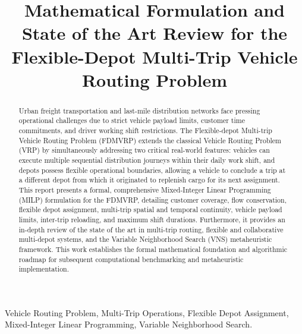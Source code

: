\documentclass[conference]{IEEEtran}
\begin{document}
\title{Mathematical Formulation and State of the Art Review for the Flexible-Depot Multi-Trip Vehicle Routing Problem}

\author{
}

\maketitle

\begin{abstract}
Urban freight transportation and last-mile distribution networks face pressing operational challenges due to strict vehicle payload limits, customer time commitments, and driver working shift restrictions. The Flexible-depot Multi-trip Vehicle Routing Problem (FDMVRP) extends the classical Vehicle Routing Problem (VRP) by simultaneously addressing two critical real-world features: vehicles can execute multiple sequential distribution journeys within their daily work shift, and depots possess flexible operational boundaries, allowing a vehicle to conclude a trip at a different depot from which it originated to replenish cargo for its next assignment. This report presents a formal, comprehensive Mixed-Integer Linear Programming (MILP) formulation for the FDMVRP, detailing customer coverage, flow conservation, flexible depot assignment, multi-trip spatial and temporal continuity, vehicle payload limits, inter-trip reloading, and maximum shift durations. Furthermore, it provides an in-depth review of the state of the art in multi-trip routing, flexible and collaborative multi-depot systems, and the Variable Neighborhood Search (VNS) metaheuristic framework. This work establishes the formal mathematical foundation and algorithmic roadmap for subsequent computational benchmarking and metaheuristic implementation.
\end{abstract}

\begin{IEEEkeywords}
Vehicle Routing Problem, Multi-Trip Operations, Flexible Depot Assignment, Mixed-Integer Linear Programming, Variable Neighborhood Search.
\end{IEEEkeywords}
\end{document}
